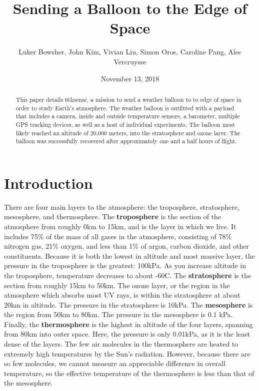 \documentclass[12pt,]{article}
\title{Sending a Balloon to the Edge of Space}
\author{Luker Bowsher, John Kim, Vivian Liu, Simon Oros, Caroline Pang, Alec
Vercruysse}
\date{November 13, 2018}
\begin{document}
\maketitle
\begin{abstract}
This paper details 6thsense, a mission to send a weather balloon to to
edge of space in order to study Earth's atmosphere. The weather balloon
is outfitted with a payload that includes a camera, inside and outside
temperature sensors, a barometer, multiple GPS tracking devices, as well
as a host of individual experiments. The balloon most likely reached an
altitude of 20,000 meters, into the stratosphere and ozone layer. The
balloon was successfully recovered after approximately one and a half
hours of flight.
\end{abstract}

\newpage

\setcounter{secnumdepth}{2} \setcounter{tocdepth}{2} \tableofcontents
\newpage
\onehalfspacing

\section{Introduction}\label{introduction}

There are four main layers to the atmosphere: the troposphere,
stratosphere, mesosphere, and thermosphere. The \textbf{troposphere} is
the section of the atmosphere from roughly 0km to 15km, and is the layer
in which we live. It includes 75\% of the mass of all gases in the
atmosphere, consisting of 78\% nitrogen gas, 21\% oxygen, and less than
1\% of argon, carbon dioxide, and other constituents. Because it is both
the lowest in altitude and most massive layer, the pressure in the
troposphere is the greatest: 100kPa. As you increase altitude in the
troposphere, temperature decreases to about -60C. The
\textbf{stratosphere} is the section from roughly 15km to 50km. The
ozone layer, or the region in the atmosphere which absorbs most UV rays,
is within the stratosphere at about 20km in altitude. The pressure in
the stratosphere is 10kPa. The \textbf{mesosphere} is the region from
50km to 80km. The pressure in the mesosphere is 0.1 kPa. Finally, the
\textbf{thermosphere} is the highest in altitude of the four layers,
spanning from 80km into outer space. Here, the pressure is only 0.01kPa,
as it is the least dense of the layers. The few air molecules in the
thermosphere are heated to extremely high temperatures by the Sun's
radiation. However, because there are so few molecules, we cannot
measure an appreciable difference in overall temperature, so the
effective temperature of the thermosphere is less than that of the
mesosphere.
\end{document}
